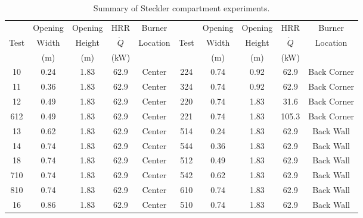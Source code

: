 \begin{table}
\caption{Summary of Steckler compartment experiments.}
\begin{center}
\begin{tabular}{|c|c|c|c|c||c|c|c|c|c|}
\hline
        & Opening   & Opening       &  HRR       & Burner       &       & Opening   & Opening     &  HRR         & Burner        \\
Test    & Width     & Height        & $\dot{Q}$  & Location     & Test  & Width     & Height      & $\dot{Q}$    & Location      \\
        & (m)       & (m)           & (kW)       &              &       & (m)       &  (m)        & (kW)         &                \\ \hline \hline
10      & 0.24      & 1.83          &  62.9      & Center       & 224   & 0.74      & 0.92        &  62.9         & Back Corner         \\ \hline
11      & 0.36      & 1.83          &  62.9      & Center       & 324   & 0.74      & 0.92        &  62.9         & Back Corner         \\ \hline
12      & 0.49      & 1.83          &  62.9      & Center       & 220   & 0.74      & 1.83        &  31.6         & Back Corner         \\ \hline
612     & 0.49      & 1.83          &  62.9      & Center       & 221   & 0.74      & 1.83        &  105.3        & Back Corner         \\ \hline
13      & 0.62      & 1.83          &  62.9      & Center       & 514   & 0.24      & 1.83        &  62.9         & Back Wall           \\ \hline
14      & 0.74      & 1.83          &  62.9      & Center       & 544   & 0.36      & 1.83        &  62.9         & Back Wall           \\ \hline
18      & 0.74      & 1.83          &  62.9      & Center       & 512   & 0.49      & 1.83        &  62.9         & Back Wall           \\ \hline
710     & 0.74      & 1.83          &  62.9      & Center       & 542   & 0.62      & 1.83        &  62.9         & Back Wall           \\ \hline
810     & 0.74      & 1.83          &  62.9      & Center       & 610   & 0.74      & 1.83        &  62.9         & Back Wall           \\ \hline
16      & 0.86      & 1.83          &  62.9      & Center       & 510   & 0.74      & 1.83        &  62.9         & Back Wall           \\ \hline

\end{tabular}
\end{center}
\end{table}

